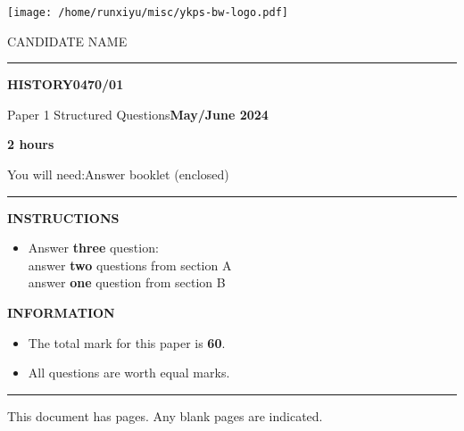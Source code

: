 \documentclass[11pt,a4paper,addpoints]{exam}
\newcommand{\esubjectcode}{0470}
\newcommand{\esubjectname}{HISTORY}
\newcommand{\ecomponentcode}{01}
\newcommand{\ecomponentname}{Paper 1 Structured Questions}
\newcommand{\emonthlong}{May/June}
\newcommand{\eyear}{24}
\newcommand{\etime}{2 hours}
\newcommand{\etotalmark}{60}
\newcommand{\eyouwillneed}{
	You will need:\quad Answer booklet (enclosed)
}
\newcommand{\einstructions}{
	\textbf{INSTRUCTIONS}
	\begin{itemize}
		\setlength{\parskip}{0ex}
		\item Answer \textbf{three} question:\\
			\mbox{}\quad answer \textbf{two} questions from section A\\
			\mbox{}\quad answer \textbf{one} question from section B
	\end{itemize}
}
\newcommand{\einformation}{
	\textbf{INFORMATION}
	\begin{itemize}
		\setlength{\parskip}{0ex}
		\item The total mark for this paper is \textbf{\etotalmark}.
		\item All questions are worth equal marks.
	\end{itemize}
}
\begin{document}
\begingroup
	\texttt{[image: /home/runxiyu/misc/ykps-bw-logo.pdf]}\smallskip

        \begin{minipage}{0.1175\textwidth}
        CANDIDATE NAME
        \end{minipage} 
        \hfill
		
	\smallskip\medskip\hrule\smallskip
	{
		\setlength{\parskip}{\medskipamount}
		\textbf{\esubjectname}\hfill\textbf{\esubjectcode/\ecomponentcode}\par
		\ecomponentname\hfill\textbf{\emonthlong{} 20\eyear}\par
		\mbox{}\hfill\textbf{\etime}\par
		\setlength{\parskip}{\smallskipamount}\par\eyouwillneed
	}\bigskip\hrule\medskip\par
	\einstructions\par\vspace*{1em}\einformation\par\vfill\par\hrule
	\begin{center}
		\vspace*{-2ex}
		This document has \textbf{\numpages} pages. Any blank pages are indicated.
	\end{center}
\endgroup
\newpage
\setlength{\parskip}{\bigskipamount}


\begin{questions}
	\question \blindtext[99]
\end{questions}


\end{document}
